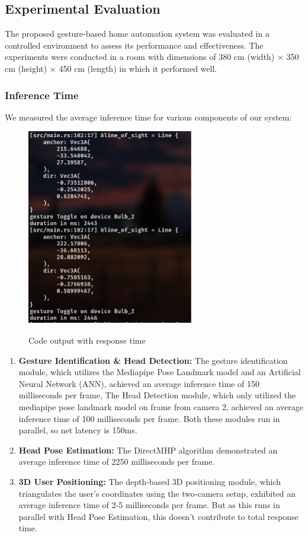\subsection{Experimental Evaluation}

The proposed gesture-based home automation system was evaluated in a controlled environment to assess its performance and effectiveness. The experiments were conducted in a room with dimensions of 380 cm (width) × 350 cm (height) × 450 cm (length) in which it performed well.

\subsubsection{Inference Time}
We measured the average inference time for various components of our system:

\begin{figure}[H]
	\centering
	\includegraphics[scale=0.7]{images/inference_time_result.jpg} \\
	\caption{Code output with response time }
	\label{fig: Code output with response time }
\end{figure}

\begin{enumerate}
	\item \textbf{Gesture Identification \& Head Detection:} The gesture identification module, which utilizes the Mediapipe Pose Landmark model and an Artificial Neural Network (ANN), achieved an average inference time of 150 milliseconds per frame, The Head Detection module, which only utilized the mediapipe pose landmark model on frame from camera 2, achieved an average inference time of 100 milliseconds per frame. Both these modules run in parallel, so net latency is 150ms.
	\item \textbf{Head Pose Estimation:} The DirectMHP algorithm demonstrated an average inference time of 2250 milliseconds per frame.
	\item \textbf{3D User Positioning:} The depth-based 3D positioning module, which triangulates the user's coordinates using the two-camera setup, exhibited an average inference time of 2-5 milliseconds per frame.
	      But as this runs in parallel with Head Pose Estimation, this doesn't contribute to total response time.
\end{enumerate}

